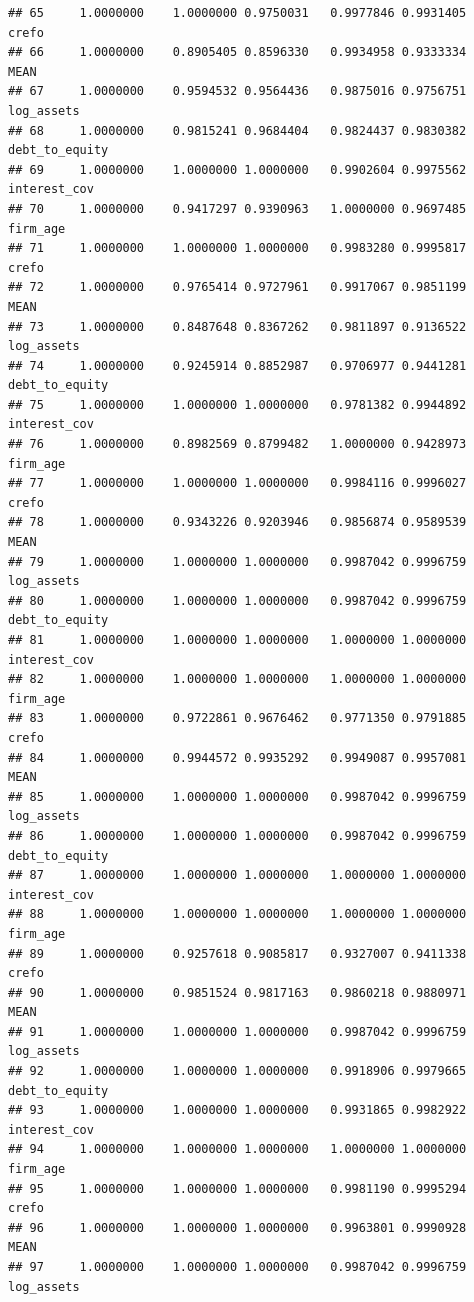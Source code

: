 \documentclass[
]{article}
\begin{document}
\begin{verbatim}
## 65     1.0000000    1.0000000 0.9750031   0.9977846 0.9931405          crefo
## 66     1.0000000    0.8905405 0.8596330   0.9934958 0.9333334           MEAN
## 67     1.0000000    0.9594532 0.9564436   0.9875016 0.9756751     log_assets
## 68     1.0000000    0.9815241 0.9684404   0.9824437 0.9830382 debt_to_equity
## 69     1.0000000    1.0000000 1.0000000   0.9902604 0.9975562   interest_cov
## 70     1.0000000    0.9417297 0.9390963   1.0000000 0.9697485       firm_age
## 71     1.0000000    1.0000000 1.0000000   0.9983280 0.9995817          crefo
## 72     1.0000000    0.9765414 0.9727961   0.9917067 0.9851199           MEAN
## 73     1.0000000    0.8487648 0.8367262   0.9811897 0.9136522     log_assets
## 74     1.0000000    0.9245914 0.8852987   0.9706977 0.9441281 debt_to_equity
## 75     1.0000000    1.0000000 1.0000000   0.9781382 0.9944892   interest_cov
## 76     1.0000000    0.8982569 0.8799482   1.0000000 0.9428973       firm_age
## 77     1.0000000    1.0000000 1.0000000   0.9984116 0.9996027          crefo
## 78     1.0000000    0.9343226 0.9203946   0.9856874 0.9589539           MEAN
## 79     1.0000000    1.0000000 1.0000000   0.9987042 0.9996759     log_assets
## 80     1.0000000    1.0000000 1.0000000   0.9987042 0.9996759 debt_to_equity
## 81     1.0000000    1.0000000 1.0000000   1.0000000 1.0000000   interest_cov
## 82     1.0000000    1.0000000 1.0000000   1.0000000 1.0000000       firm_age
## 83     1.0000000    0.9722861 0.9676462   0.9771350 0.9791885          crefo
## 84     1.0000000    0.9944572 0.9935292   0.9949087 0.9957081           MEAN
## 85     1.0000000    1.0000000 1.0000000   0.9987042 0.9996759     log_assets
## 86     1.0000000    1.0000000 1.0000000   0.9987042 0.9996759 debt_to_equity
## 87     1.0000000    1.0000000 1.0000000   1.0000000 1.0000000   interest_cov
## 88     1.0000000    1.0000000 1.0000000   1.0000000 1.0000000       firm_age
## 89     1.0000000    0.9257618 0.9085817   0.9327007 0.9411338          crefo
## 90     1.0000000    0.9851524 0.9817163   0.9860218 0.9880971           MEAN
## 91     1.0000000    1.0000000 1.0000000   0.9987042 0.9996759     log_assets
## 92     1.0000000    1.0000000 1.0000000   0.9918906 0.9979665 debt_to_equity
## 93     1.0000000    1.0000000 1.0000000   0.9931865 0.9982922   interest_cov
## 94     1.0000000    1.0000000 1.0000000   1.0000000 1.0000000       firm_age
## 95     1.0000000    1.0000000 1.0000000   0.9981190 0.9995294          crefo
## 96     1.0000000    1.0000000 1.0000000   0.9963801 0.9990928           MEAN
## 97     1.0000000    1.0000000 1.0000000   0.9987042 0.9996759     log_assets

\end{verbatim}
\end{document}
